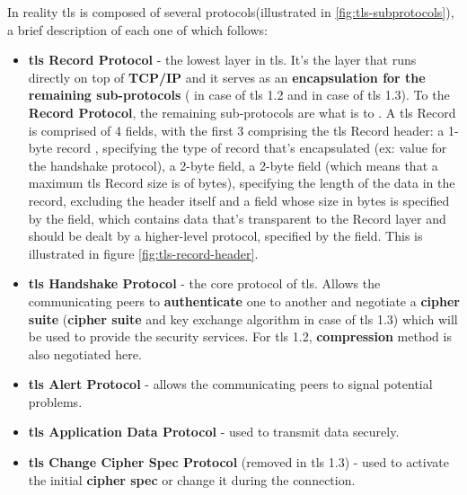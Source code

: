 \documentclass{llncs}
\begin{document}
In reality \gls{tls} is composed of several protocols(illustrated in \ref{fig:tls-subprotocols}), a brief description of each
one of which follows:
\begin{itemize}
  \item \textbf{\gls{tls} Record Protocol} - the lowest layer in \gls{tls}. It's
  the layer that runs directly on top of \textbf{TCP/IP} and it serves as an
   \textbf{encapsulation for the remaining sub-protocols} ( in case of \gls{tls} 1.2
   and  in case of \gls{tls} 1.3). To the  \textbf{Record Protocol},
   the remaining sub-protocols are what  is to .
   A \gls{tls} Record is comprised of 4 fields, with the first 3 comprising the
   \gls{tls} Record header: a 1-byte record ,
   specifying the type of record that's encapsulated (ex: value 
   for the handshake protocol), a 2-byte  field, a
   2-byte  field (which means that a maximum \gls{tls} Record size
   is of  bytes), specifying the length of the data in the record, excluding
   the header itself and a  field whose size in bytes is specified
   by the  field, which contains data that's
   transparent to the Record layer and should be dealt by a higher-level protocol,
   specified by the  field. This is illustrated in figure \ref{fig:tls-record-header}.
  \item \textbf{\gls{tls} Handshake Protocol} - the core protocol of \gls{tls}.
  Allows the communicating peers to \textbf{authenticate} one to another and negotiate
  a \textbf{cipher suite} (\textbf{cipher suite} and key exchange algorithm in case of \gls{tls} 1.3) which will be used to provide the security services. For \gls{tls} 1.2,
  \textbf{compression} method is also negotiated here.
  \item \textbf{\gls{tls} Alert Protocol} - allows the communicating peers to
  signal potential problems.
  \item \textbf{\gls{tls} Application Data Protocol} - used to transmit data securely.
  \item \textbf{\gls{tls} Change Cipher Spec Protocol} (removed in \gls{tls} 1.3) -
  used to activate the initial \textbf{cipher spec} or change it during the connection.
\end{itemize}
\end{document}

